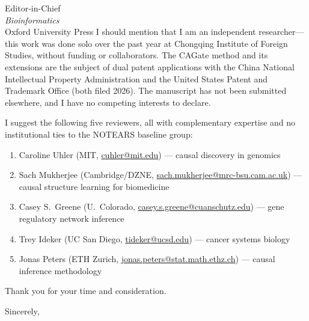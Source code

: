 \documentclass[12pt]{letter}
\begin{document}
\begin{letter}{Editor-in-Chief\\\textit{Bioinformatics}\\Oxford University Press}
I should mention that I am an independent researcher---this work was done solo over the past year at Chongqing Institute of Foreign Studies, without funding or collaborators. The CAGate method and its extensions are the subject of dual patent applications with the China National Intellectual Property Administration and the United States Patent and Trademark Office (both filed 2026). The manuscript has not been submitted elsewhere, and I have no competing interests to declare.

I suggest the following five reviewers, all with complementary expertise and no institutional ties to the NOTEARS baseline group:
\begin{enumerate}
\item Caroline Uhler (MIT, \href{mailto:cuhler@mit.edu}{cuhler@mit.edu}) --- causal discovery in genomics
\item Sach Mukherjee (Cambridge/DZNE, \href{mailto:sach.mukherjee@mrc-bsu.cam.ac.uk}{sach.mukherjee@mrc-bsu.cam.ac.uk}) --- causal structure learning for biomedicine
\item Casey S.\ Greene (U.\ Colorado, \href{mailto:casey.s.greene@cuanschutz.edu}{casey.s.greene@cuanschutz.edu}) --- gene regulatory network inference
\item Trey Ideker (UC San Diego, \href{mailto:tideker@ucsd.edu}{tideker@ucsd.edu}) --- cancer systems biology
\item Jonas Peters (ETH Zurich, \href{mailto:jonas.peters@stat.math.ethz.ch}{jonas.peters@stat.math.ethz.ch}) --- causal inference methodology
\end{enumerate}

Thank you for your time and consideration.

\closing{Sincerely,}

\end{letter}
\end{document}
